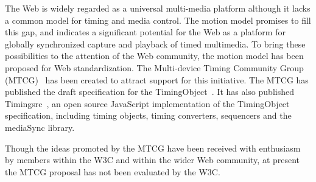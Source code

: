 The Web is widely regarded as a universal multi-media platform although it
lacks a common model for timing and media control. The motion model promises
to fill this gap, and indicates a significant potential for the Web as a
platform for globally synchronized capture and playback of timed multimedia.
To bring these possibilities to the attention of the Web community, the motion
model has been proposed for Web standardization. The Multi-device Timing
Community Group (MTCG)~\cite{mtcg} has been created to attract support for
this initiative. The MTCG has published the draft specification for the
TimingObject~\cite{timingobject}. It has also published
Timingsrc~\cite{timingsrc}, an open source JavaScript implementation of the
TimingObject specification, including timing objects, timing converters,
sequencers and the mediaSync library.

Though the ideas promoted by the MTCG have been received with enthusiasm by
members within the W3C and within the wider Web community, at present the MTCG
proposal has not been evaluated by the W3C.
